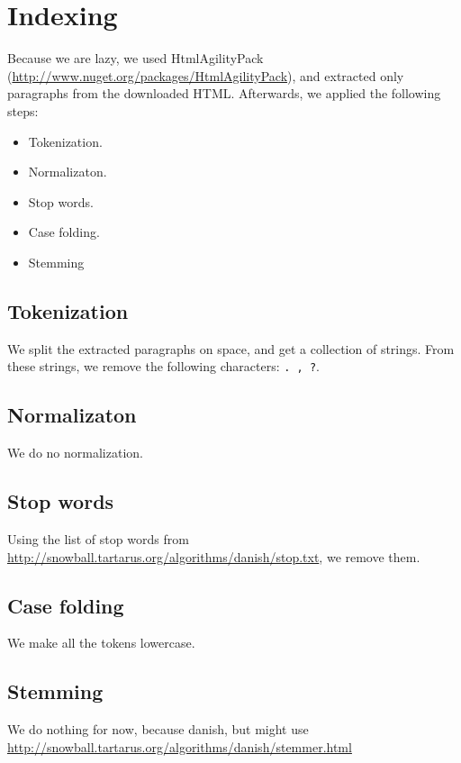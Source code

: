 \section{Indexing}
Because we are lazy, we used HtmlAgilityPack (\url{http://www.nuget.org/packages/HtmlAgilityPack}), and extracted only paragraphs from the downloaded HTML. Afterwards, we applied the following steps:
\begin{itemize}
	\item Tokenization.
	\item Normalizaton.
	\item Stop words.
	\item Case folding.
	\item Stemming
\end{itemize}

\subsection{Tokenization}
We split the extracted paragraphs on space, and get a collection of strings. From these strings, we remove the following characters: \texttt{. , ?}.

\subsection{Normalizaton}
We do no normalization.

\subsection{Stop words}
Using the list of stop words from \url{http://snowball.tartarus.org/algorithms/danish/stop.txt}, we remove them.

\subsection{Case folding}
We make all the tokens lowercase.

\subsection{Stemming}
We do nothing for now, because danish, but might use \url{http://snowball.tartarus.org/algorithms/danish/stemmer.html}
